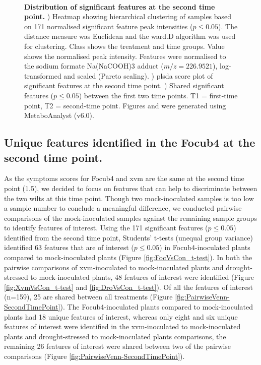 \begin{figure}[!hptb]
\begin{minipage}[b]{0.57\textwidth}
\begin{subfigure}[b]{\linewidth}
        \caption{}
        \label{fig:FeaturesTimePoint_Venn}
      \end{subfigure}\\[\baselineskip]
    \end{minipage}
    \caption[Distribution of features at the second time point.]{\textbf{Distribution of significant features at the second time point.}
    \textbf{}) Heatmap showing hierarchical clustering of samples based on 171 normalised significant feature peak intensities ($p \le0.05$). The distance measure was Euclidean and the ward.D algorithm was used for clustering. Class shows the treatment and time groups. Value shows the normalised peak intensity. Features were normalised to the sodium formate Na(NaCOOH)3 adduct ($m/z=226.9521$), log-transformed and scaled (Pareto scaling). 
    \textbf{}) \acl{plsda} score plot of significant features at the second time point. 
    \textbf{}) Shared significant features ($p \le0.05$) between the first two time points. T1 = first-time point, T2 = second-time point.
    Figures  and  were generated using MetaboAnalyst (v6.0). 
    }
    \label{fig:SecondTimePointSigFig}
\end{figure}


\subsection{Unique features identified in the \acl{Focub4} at the second time point.}

As the symptoms scores for \ac{Focub4} and \ac{xvm} are the same at the second time point (1.5), we decided to focus on features that can help to discriminate between the two wilts at this time point. Though two mock-inoculated samples is too low a sample number to conclude a meaningful difference, we conducted pairwise comparisons of the mock-inoculated samples against the remaining sample groups to identify features of interest. Using the 171 significant features ($p \le0.05$) identified from the second time point, Students' t-tests (unequal group variance) identified 63 features that are of interest ($p \le0.05$) in \ac{Focub4}-inoculated plants compared to mock-inoculated plants (Figure  \ref{fig:FocVsCon_t-test}). In both the pairwise comparisons of \ac{xvm}-inoculated to mock-inoculated plants and drought-stressed to mock-inoculated plants, 48 features of interest were identified (Figure  \ref{fig:XvmVsCon_t-test} and \ref{fig:DroVsCon_t-test}).
Of all the features of interest (n=159), 25 are shared between all treatments (Figure  \ref{fig:PairwiseVenn-SecondTimePoint}). The \ac{Focub4}-inoculated plants compared to mock-inoculated plants had 18 unique features of interest, whereas only eight and six unique features of interest were identified in the \ac{xvm}-inoculated to mock-inoculated plants and drought-stressed to mock-inoculated plants comparisons, the remaining 26 features of interest were shared between two of the pairwise comparisons (Figure  \ref{fig:PairwiseVenn-SecondTimePoint}).

